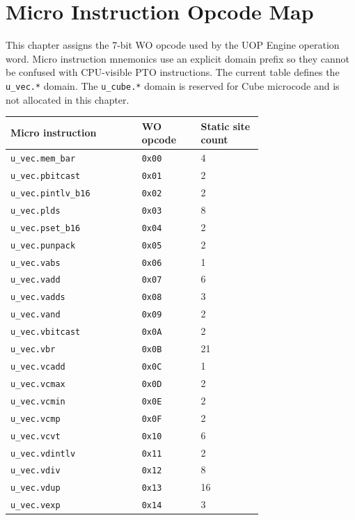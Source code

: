 \section{Micro Instruction Opcode Map}
\label{sec:micro_instruction_opcode_map}
This chapter assigns the 7-bit WO opcode used by the UOP Engine operation word. Micro instruction mnemonics use an explicit domain prefix so they cannot be confused with CPU-visible PTO instructions. The current table defines the \texttt{u\_vec.*} domain. The \texttt{u\_cube.*} domain is reserved for Cube microcode and is not allocated in this chapter.
{\small
\begin{longtable}{@{}L{0.38\linewidth}R{0.16\linewidth}R{0.18\linewidth}@{}}
\toprule
Micro instruction & WO opcode & Static site count \\
\midrule
\texttt{u\_vec.mem\_bar} & \texttt{0x00} & 4 \\
\texttt{u\_vec.pbitcast} & \texttt{0x01} & 2 \\
\texttt{u\_vec.pintlv\_b16} & \texttt{0x02} & 2 \\
\texttt{u\_vec.plds} & \texttt{0x03} & 8 \\
\texttt{u\_vec.pset\_b16} & \texttt{0x04} & 2 \\
\texttt{u\_vec.punpack} & \texttt{0x05} & 2 \\
\texttt{u\_vec.vabs} & \texttt{0x06} & 1 \\
\texttt{u\_vec.vadd} & \texttt{0x07} & 6 \\
\texttt{u\_vec.vadds} & \texttt{0x08} & 3 \\
\texttt{u\_vec.vand} & \texttt{0x09} & 2 \\
\texttt{u\_vec.vbitcast} & \texttt{0x0A} & 2 \\
\texttt{u\_vec.vbr} & \texttt{0x0B} & 21 \\
\texttt{u\_vec.vcadd} & \texttt{0x0C} & 1 \\
\texttt{u\_vec.vcmax} & \texttt{0x0D} & 2 \\
\texttt{u\_vec.vcmin} & \texttt{0x0E} & 2 \\
\texttt{u\_vec.vcmp} & \texttt{0x0F} & 2 \\
\texttt{u\_vec.vcvt} & \texttt{0x10} & 6 \\
\texttt{u\_vec.vdintlv} & \texttt{0x11} & 2 \\
\texttt{u\_vec.vdiv} & \texttt{0x12} & 8 \\
\texttt{u\_vec.vdup} & \texttt{0x13} & 16 \\
\texttt{u\_vec.vexp} & \texttt{0x14} & 3 \\

\end{longtable}}
